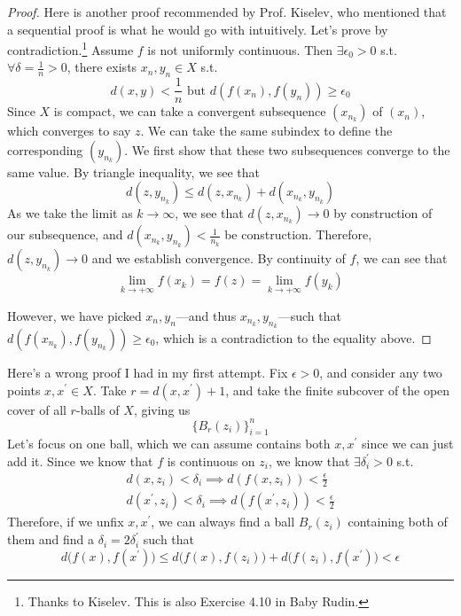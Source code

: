   \begin{proof}
    Here is another proof recommended by Prof. Kiselev, who mentioned that a sequential proof is what he would go with intuitively. Let's prove by contradiction.\footnote{Thanks to Kiselev. This is also Exercise 4.10 in Baby Rudin.} Assume $f$ is not uniformly continuous. Then $\exists \epsilon_0 > 0$ s.t. $\forall \delta = \frac{1}{n} > 0$, there exists $x_n, y_n \in X$ s.t. 
    \begin{equation}
      d(x, y) < \frac{1}{n} \text{ but } d(f(x_n), f(y_n)) \geq \epsilon_0
    \end{equation}
    Since $X$ is compact, we can take a convergent subsequence $(x_{n_k})$ of $(x_n)$, which converges to say $z$. We can take the same subindex to define the corresponding $(y_{n_k})$. We first show that these two subsequences converge to the same value. By triangle inequality, we see that
    \begin{equation}
      d(z, y_{n_k}) \leq d(z, x_{n_k}) + d(x_{n_k}, y_{n_k}) 
    \end{equation}
    As we take the limit as $k \to \infty$, we see that $d(z, x_{n_k}) \to 0$ by construction of our subsequence, and $d(x_{n_k}, y_{n_k}) < \frac{1}{n_k}$ be construction. Therefore, $d(z, y_{n_k}) \to 0$ and we establish convergence. By continuity of $f$, we can see that 
    \begin{equation}
      \lim_{k \to +\infty} f(x_k) = f(z) = \lim_{k \to +\infty} f(y_k)
    \end{equation}

    However, we have picked $x_n, y_n$---and thus $x_{n_k}, y_{n_k}$---such that $d(f(x_{n_k}), f(y_{n_k})) \geq \epsilon_0$, which is a contradiction to the equality above. 
  \end{proof} 

  \begin{example}
    Here's a wrong proof I had in my first attempt. Fix $\epsilon > 0$, and consider any two points $x, x^\prime \in X$. Take $r = d(x, x^\prime) + 1$, and take the finite subcover of the open cover of all $r$-balls of $X$, giving us 
    \begin{equation}
      \{B_r (z_i)\}_{i=1}^n 
    \end{equation}
    Let's focus on one ball, which we can assume contains both $x, x^\prime$ since we can just add it. Since we know that $f$ is continuous on $z_i$, we know that $\exists \delta_i^\prime > 0$ s.t. 
    \begin{align}
      d(x, z_i) < \delta_i \implies d(f(x, z_i)) < \frac{\epsilon}{2} \\
      d(x^\prime, z_i) < \delta_i \implies d(f(x^\prime, z_i)) < \frac{\epsilon}{2}
    \end{align}
    Therefore, if we unfix $x, x^\prime$, we can always find a ball $B_r (z_i)$ containing both of them and find a $\delta_i = 2 \delta_i^\prime$ such that 
    \begin{equation}
      d\big( f(x), f(x^\prime) \big) \leq d \big( f(x), f(z_i) \big) + d\big( f(z_i), f(x^\prime) \big) < \epsilon
    \end{equation}
  \end{example}

